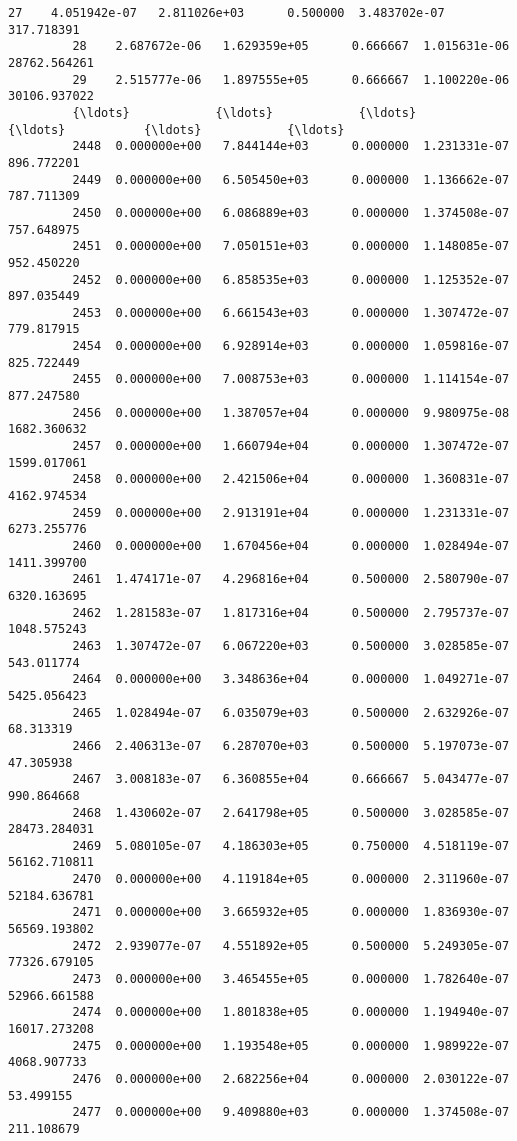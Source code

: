 \documentclass[11pt]{article}
\begin{document}
\begin{Verbatim}[commandchars=\\\{\}]
         27    4.051942e-07   2.811026e+03      0.500000  3.483702e-07     317.718391   
         28    2.687672e-06   1.629359e+05      0.666667  1.015631e-06   28762.564261   
         29    2.515777e-06   1.897555e+05      0.666667  1.100220e-06   30106.937022   
         {\ldots}            {\ldots}            {\ldots}           {\ldots}           {\ldots}            {\ldots}   
         2448  0.000000e+00   7.844144e+03      0.000000  1.231331e-07     896.772201   
         2449  0.000000e+00   6.505450e+03      0.000000  1.136662e-07     787.711309   
         2450  0.000000e+00   6.086889e+03      0.000000  1.374508e-07     757.648975   
         2451  0.000000e+00   7.050151e+03      0.000000  1.148085e-07     952.450220   
         2452  0.000000e+00   6.858535e+03      0.000000  1.125352e-07     897.035449   
         2453  0.000000e+00   6.661543e+03      0.000000  1.307472e-07     779.817915   
         2454  0.000000e+00   6.928914e+03      0.000000  1.059816e-07     825.722449   
         2455  0.000000e+00   7.008753e+03      0.000000  1.114154e-07     877.247580   
         2456  0.000000e+00   1.387057e+04      0.000000  9.980975e-08    1682.360632   
         2457  0.000000e+00   1.660794e+04      0.000000  1.307472e-07    1599.017061   
         2458  0.000000e+00   2.421506e+04      0.000000  1.360831e-07    4162.974534   
         2459  0.000000e+00   2.913191e+04      0.000000  1.231331e-07    6273.255776   
         2460  0.000000e+00   1.670456e+04      0.000000  1.028494e-07    1411.399700   
         2461  1.474171e-07   4.296816e+04      0.500000  2.580790e-07    6320.163695   
         2462  1.281583e-07   1.817316e+04      0.500000  2.795737e-07    1048.575243   
         2463  1.307472e-07   6.067220e+03      0.500000  3.028585e-07     543.011774   
         2464  0.000000e+00   3.348636e+04      0.000000  1.049271e-07    5425.056423   
         2465  1.028494e-07   6.035079e+03      0.500000  2.632926e-07      68.313319   
         2466  2.406313e-07   6.287070e+03      0.500000  5.197073e-07      47.305938   
         2467  3.008183e-07   6.360855e+04      0.666667  5.043477e-07     990.864668   
         2468  1.430602e-07   2.641798e+05      0.500000  3.028585e-07   28473.284031   
         2469  5.080105e-07   4.186303e+05      0.750000  4.518119e-07   56162.710811   
         2470  0.000000e+00   4.119184e+05      0.000000  2.311960e-07   52184.636781   
         2471  0.000000e+00   3.665932e+05      0.000000  1.836930e-07   56569.193802   
         2472  2.939077e-07   4.551892e+05      0.500000  5.249305e-07   77326.679105   
         2473  0.000000e+00   3.465455e+05      0.000000  1.782640e-07   52966.661588   
         2474  0.000000e+00   1.801838e+05      0.000000  1.194940e-07   16017.273208   
         2475  0.000000e+00   1.193548e+05      0.000000  1.989922e-07    4068.907733   
         2476  0.000000e+00   2.682256e+04      0.000000  2.030122e-07      53.499155   
         2477  0.000000e+00   9.409880e+03      0.000000  1.374508e-07     211.108679   
         

\end{Verbatim}
\end{document}
